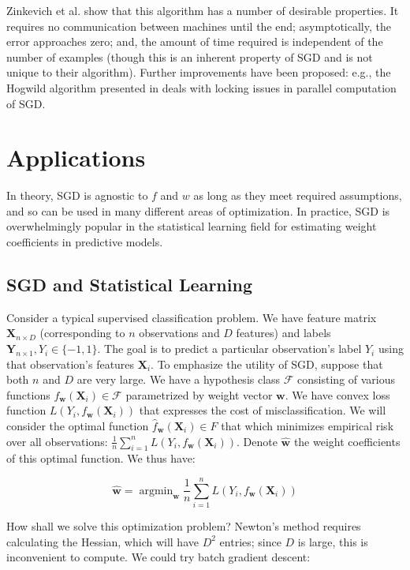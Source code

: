 \documentclass{article}
\DeclareMathOperator*{\argmin}{argmin}
\begin{document}
\medskip

Zinkevich et al. show that this algorithm has a number of desirable properties.
It requires no communication between machines until the end; asymptotically, the
error approaches zero; and, the amount of time required is independent of the number of
examples (though this is an inherent property of SGD and is not unique to their
algorithm). Further improvements have been proposed: e.g., the Hogwild algorithm
presented in \cite{recht2011hogwild} deals with locking issues in parallel
computation of SGD.

\section{Applications}

In theory, SGD is agnostic to $f$ and $w$ as long as they meet required
assumptions, and so can be used in many different areas of optimization. In
practice, SGD is overwhelmingly popular in the statistical learning
field for estimating weight coefficients in predictive models. 

\subsection{SGD and Statistical Learning}

Consider a typical supervised classification problem. We have
feature matrix $\bm{X}_{n \times D}$ (corresponding to $n$ observations and $D$
features) and labels $\bm{Y}_{n \times 1}, Y_i \in \{-1, 1\}$. The goal is to
predict a particular observation's label $Y_i$ using that observation's features
$\bm{X}_i$. To emphasize the utility of SGD, suppose that both $n$ and $D$ are
very large.
We have a hypothesis class $\mathcal{F}$ consisting of
various functions $f_{\bm{w}}(\bm{X}_i) \in \mathcal{F}$ parametrized by weight
vector $\bm{w}$. We have convex loss function $L(Y_i, f_{\bm{w}}(\bm{X}_i))$ that
expresses the cost of misclassification. 
We will consider the optimal function $\hat{f}_{\bm{w}}(\bm{X}_i) \in F$ 
that which minimizes empirical risk over all observations: $\frac{1}{n}
\sum_{i=1}^n L(Y_i, f_{\bm{w}}(\bm{X}_i))$.
Denote $\hat{\bm{w}}$ the weight coefficients of this optimal function. We thus
have:

\begin{equation}
	\hat{\bm{w}} = \argmin_{\bm{w}}\frac{1}{n} \sum_{i=1}^n L(Y_i, f_{\bm{w}}(\bm{X}_i))
\end{equation}

How shall we solve this optimization problem? Newton's method requires
calculating the Hessian, which will have $D^2$ entries; since $D$ is large,
this is inconvenient to compute. We could try batch gradient descent:
\end{document}
